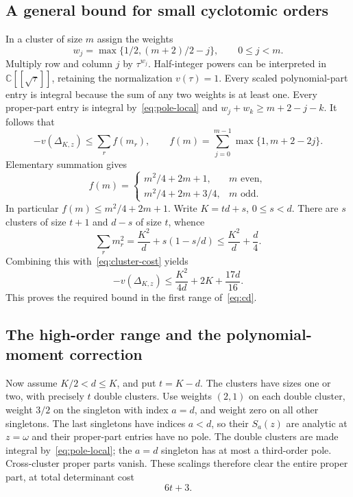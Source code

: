 \documentclass[11pt,letterpaper]{article}
\numberwithin{equation}{section}
\theoremstyle{remark}
\newcommand{\C}{\mathbb C}
\begin{document}
\subsection{A general bound for small cyclotomic orders}

In a cluster of size $m$ assign the weights
\begin{equation*}
 w_j=\max\{1/2,(m+2)/2-j\},\qquad 0\le j<m.
\end{equation*}
Multiply row and column $j$ by $\tau^{w_j}$. Half-integer powers can be interpreted in $\C[[\sqrt\tau]]$, retaining the normalization $v(\tau)=1$. Every scaled polynomial-part entry is integral because the sum of any two weights is at least one. Every proper-part entry is integral by~\eqref{eq:pole-local} and $w_j+w_k\ge m+2-j-k$. It follows that
\begin{equation}\label{eq:cluster-cost}
 -v(\Delta_{K,z})\le\sum_r f(m_r),\qquad
 f(m)=\sum_{j=0}^{m-1}\max\{1,m+2-2j\}.
\end{equation}
Elementary summation gives
\begin{equation*}
 f(m)=\begin{cases}
 m^2/4+2m+1,&m\text{ even},\\
 m^2/4+2m+3/4,&m\text{ odd}.
 \end{cases}
\end{equation*}
In particular $f(m)\le m^2/4+2m+1$. Write $K=td+s$, $0\le s<d$. There are $s$ clusters of size $t+1$ and $d-s$ of size $t$, whence
\begin{equation*}
 \sum_r m_r^2=\frac{K^2}{d}+s(1-s/d)
 \le\frac{K^2}{d}+\frac d4.
\end{equation*}
Combining this with~\eqref{eq:cluster-cost} yields
\begin{equation}\label{eq:low-order}
 -v(\Delta_{K,z})\le\frac{K^2}{4d}+2K+\frac{17d}{16}.
\end{equation}
This proves the required bound in the first range of~\eqref{eq:cd}.

\subsection{The high-order range and the polynomial-moment correction}

Now assume $K/2<d\le K$, and put $t=K-d$. The clusters have sizes one or two, with precisely $t$ double clusters. Use weights $(2,1)$ on each double cluster, weight $3/2$ on the singleton with index $a=d$, and weight zero on all other singletons. The last singletons have indices $a<d$, so their $S_a(z)$ are analytic at $z=\omega$ and their proper-part entries have no pole. The double clusters are made integral by~\eqref{eq:pole-local}; the $a=d$ singleton has at most a third-order pole. Cross-cluster proper parts vanish. These scalings therefore clear the entire proper part, at total determinant cost
\begin{equation}\label{eq:high-scale}
 6t+3.
\end{equation}
\end{document}
